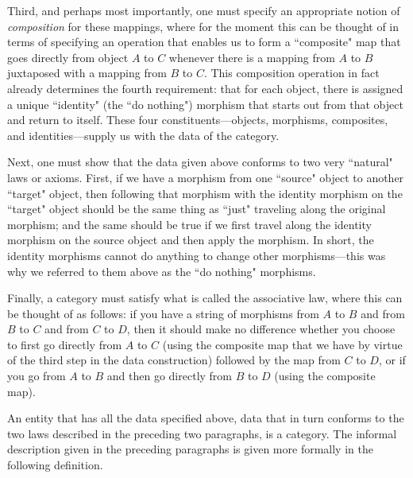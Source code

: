 \documentclass[a4paper]{book}
\theoremstyle{definition}
\theoremstyle{definition}
\theoremstyle{definition}
\theoremstyle{theorem}
\theoremstyle{definition}
\begin{document}
	Third, and perhaps most importantly, one must specify an appropriate notion of \textit{composition} for these mappings, where for the moment this can be thought of in terms of specifying an operation that enables us to form a ``composite" map that goes directly from object $A$ to $C$ whenever there is a mapping from $A$ to $B$ juxtaposed with a mapping from $B$ to $C$. This composition operation in fact already determines the fourth requirement: that for each object, there is assigned a unique ``identity" (the ``do nothing") morphism that starts out from that object and return to itself. These four constituents---objects, morphisms, composites, and identities---supply us with the data of the category. \par 
	Next, one must show that the data given above conforms to two very ``natural" laws or axioms. First, if we have a morphism from one ``source" object to another ``target" object, then following that morphism with the identity morphism on the ``target" object should be the same thing as ``just" traveling along the original morphism; and the same should be true if we first travel along the identity morphism on the source object and then apply the morphism. In short, the identity morphisms cannot do anything to change other morphisms---this was why we referred to them above as the ``do nothing" morphisms. \par 
	Finally, a category must satisfy what is called the associative law, where this can be thought of as follows: if you have a string of morphisms from $A$ to $B$ and from $B$ to $C$ and from $C$ to $D$, then it should make no difference whether you choose to first go directly from $A$ to $C$ (using the composite map that we have by virtue of the third step in the data construction) followed by the map from $C$ to $D$, or if you go from $A$ to $B$ and then go directly from $B$ to $D$ (using the composite map). \par 
	An entity that has all the data specified above, data that in turn conforms to the two laws described in the preceding two paragraphs, is a category. The informal description given in the preceding paragraphs is given more formally in the following definition. 
\end{document}
